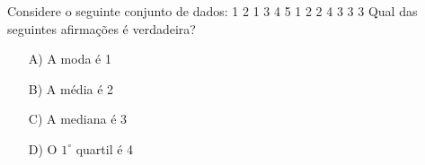 Considere o seguinte conjunto de dados: 1 2 1 3 4 5 1 2 2 4 3 3 3
Qual das seguintes afirmações é verdadeira?
\begin{enumerate}
\item [A)] A moda é 1
\item [B)] A média é 2
\item [C)] A mediana é 3
\item [D)] O $1^{\circ}$ quartil é 4
\end{enumerate}
